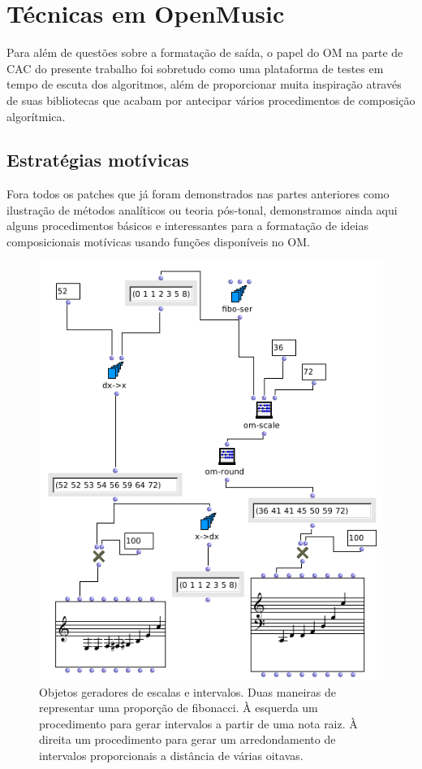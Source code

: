 \documentclass[
	12pt,				%
	openright,			%
	twoside,			%
	a4paper,			%
	english,			%
	french,				%
	spanish,			%
	brazil				%
	]{abntex2}
\begin{document}
\section{Técnicas em OpenMusic}

Para além de questões sobre a formatação de saída, o papel do OM na parte de CAC do presente 
trabalho foi sobretudo como uma plataforma de testes em tempo de escuta dos algoritmos, além de proporcionar muita inspiração através de suas bibliotecas que acabam por antecipar vários procedimentos de composição algorítmica.


\subsection{Estratégias motívicas}

Fora todos os patches que já foram demonstrados nas partes anteriores como ilustração de métodos analíticos ou teoria pós-tonal, demonstramos ainda aqui alguns procedimentos básicos e interessantes para a formatação de ideias composicionais motívicas usando funções disponíveis no OM.


\begin{figure}[!h]
	\caption{\label{fig_grafico}Objetos geradores de escalas e intervalos. Duas maneiras de representar uma proporção de fibonacci. À esquerda um procedimento para gerar intervalos a partir de uma nota raiz. À direita um procedimento para gerar um arredondamento de intervalos proporcionais a distância de várias oitavas. }
	\begin{center}
	    \includegraphics[scale=0.6]{OM_settheory/fibonacci.png}
	\end{center}
\end{figure}
\end{document}
